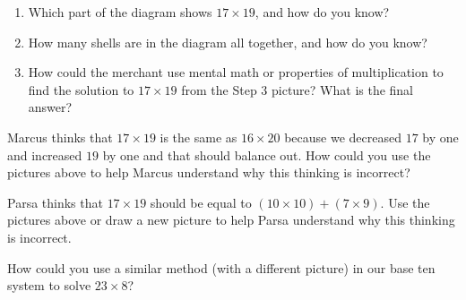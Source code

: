 \documentclass[nooutcomes, noauthor, handout]{ximera}
\begin{document}
\begin{problem}
\begin{enumerate}
	\item Which part of the diagram shows $17 \times 19$, and how do you know?
	\item How many shells are in the diagram all together, and how do you know?
	\item How could the merchant use mental math or properties of multiplication to find the solution to $17 \times 19$ from the Step 3 picture? What is the final answer?
\end{enumerate}
\end{problem}


\begin{problem}
Marcus thinks that $17 \times 19$ is the same as $16 \times 20$ because we decreased $17$ by one and increased $19$ by one and that should balance out. How could you use the pictures above to help Marcus understand why this thinking is incorrect?
\end{problem}


\begin{problem}
Parsa thinks that $17 \times 19$ should be equal to $(10 \times 10) + (7 \times 9)$. Use the pictures above or draw a new picture to help Parsa understand why this thinking is incorrect.
\end{problem}


\begin{problem}
How could you use a similar method (with a different picture) in our base ten system to solve $23 \times 8$?
\end{problem}

\end{document}
